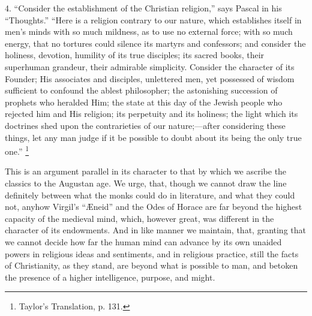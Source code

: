 4. ``Consider the establishment of the Christian
religion,'' says Pascal in his ``Thoughts.'' ``Here is
a religion contrary to our nature, which establishes itself in
men's minds with so much mildness, as to use no external force; with
so much energy, that no tortures could silence its martyrs and
confessors; and consider the holiness, devotion, humility of its true
disciples; its sacred books, their superhuman grandeur, their
admirable simplicity. Consider the character of its Founder; His
associates and disciples, unlettered men, yet possessed of wisdom
sufficient to confound the ablest philosopher; the astonishing
succession of prophets who heralded Him; the state at this day of the
Jewish people who rejected him and His religion; its perpetuity and
its holiness; the light which its doctrines shed upon the
contrarieties of our nature;—after considering these things, let any
man judge if it be possible to doubt about its being the only true
one.'' \footnote{Taylor's
Translation, p. 131.}

This is an argument parallel in its character to that by which we
ascribe the classics to the Augustan age. We urge, that, though we
cannot draw the line definitely between what the monks could do in
literature, and what they could not, anyhow Virgil's ``Æneid''
and the Odes of Horace are far beyond the highest capacity of the
medieval mind, which, however great, was different in the character of
its endowments. And in like manner we maintain, that, granting that we
cannot decide how far the human mind can advance by its own unaided
powers in religious ideas and sentiments, and in religious practice,
still the facts of Christianity, as they stand, are beyond what is
possible to man, and betoken the presence of a higher intelligence,
purpose, and might.

